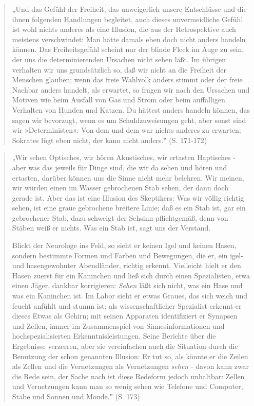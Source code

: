 \documentclass[
  a4paper,
]{report}
\begin{document}
\begin{quote}
„Und das Gefühl der Freiheit, das unweigerlich unsere Entschlüsse und die ihnen folgenden Handlungen begleitet, auch dieses unvermeidliche Gefühl ist wohl nichts anderes als eine Illusion, die aus der Retrospektive auch meistens verschwindet: Man hätte damals eben doch nicht anders handeln können. Das Freiheitsgefühl scheint nur der blinde Fleck im Auge zu sein, der uns die determinierenden Ursachen nicht sehen läßt. Im übrigen verhalten wir uns grundsätzlich so, daß wir nicht an die Freiheit der Menschen glauben; wenn das freie Wahlvolk anders stimmt oder der freie Nachbar anders handelt, als erwartet, so fragen wir nach den Ursachen und Motiven wie beim Ausfall von Gas und Strom oder beim auffälligen Verhalten von Hunden und Katzen. Du hättest anders handeln können, das sagen wir bevorzugt, wenn es um Schuldzuweisungen geht, aber sonst sind wir »Deterministen«: Von dem und dem war nichts anderes zu erwarten; Sokrates lügt eben nicht, der kann nicht anders.‟ (S. 171-172)
\end{quote}

\begin{quote}
„Wir sehen Optisches, wir hören Akustisches, wir ertasten Haptisches - aber was das jeweils für Dinge sind, die wir da sehen und hören und ertasten, darüber können uns die Sinne nicht mehr belehren. Wir meinen, wir würden einen im Wasser gebrochenen Stab sehen, der dann doch gerade ist. Aber das ist eine Illusion des Skeptikers: Was wir völlig richtig sehen, ist eine graue gebrochene breitere Linie; daß es ein Stab ist, gar ein gebrochener Stab, dazu schweigt der Sehsinn pflichtgemäß, denn von Stäben weiß er nichts. Was ein Stab ist, sagt uns der Verstand.

Blickt der Neurologe ins Feld, so sieht er keinen Igel und keinen Hasen, sondern bestimmte Formen und Farben und Bewegungen, die er, ein igel- und hasengewohnter Abendländer, richtig erkennt. Vielleicht hielt er den Hasen zuerst für ein Kaninchen und ließ sich durch einen Spezialisten, etwa einen Jäger, dankbar korrigieren: \emph{Sehen} läßt sich nicht, was ein Hase und was ein Kaninchen ist. Im Labor sieht er etwas Graues, das sich weich und feucht anfühlt und stumm ist; als wissenschaftlicher Spezialist erkennt er dieses Etwas als Gehirn; mit seinen Apparaten identifiziert er Synapsen und Zellen, immer im Zusammenspiel von Sinnesinformationen und hochspezialisierten Erkenntnisleistungen. Seine Berichte über die Ergebnisse verzerren, aber sie vereinfachen auch die Situation durch die Benutzung der schon genannten Illusion: Er tut so, als könnte er die Zeilen als Zellen und die Vernetzungen als Vernetzungen \emph{sehen} - davon kann zwar die Rede sein, der Sache nach ist diese Redeform jedoch unhaltbar: Zellen und Vernetzungen kann man so wenig sehen wie Telefone und Computer, Stäbe und Sonnen und Monde.‟ (S. 173)
\end{quote}
\end{document}
